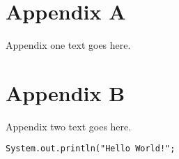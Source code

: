 \documentclass[12pt,journal,compsoc]{IEEEtran}
\begin{document}
\appendices
\section*{Appendix A}

Appendix one text goes here.

\section*{Appendix B}
Appendix two text goes here.

\begin{lstlisting}[label=code:hello_world, caption={Hello World Code Snippet}]
System.out.println("Hello World!";
\end{lstlisting}

\ifCLASSOPTIONcaptionsoff
  \newpage
\fi





\end{document}
